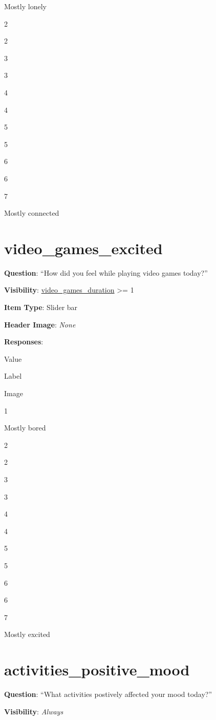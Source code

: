 \documentclass[]{book}
\begin{document}
Mostly lonely

2

2

3

3

4

4

5

5

6

6

7

Mostly connected

\hypertarget{video_games_excited}{%
\section{video\_games\_excited}\label{video_games_excited}}

\textbf{Question}: ``How did you feel while playing video games today?''

\textbf{Visibility}: \protect\hyperlink{video_games_duration}{video\_games\_duration} \textgreater{}= 1

\textbf{Item Type}: Slider bar

\textbf{Header Image}: \emph{None}

\textbf{Responses}:

Value

Label

Image

1

Mostly bored

2

2

3

3

4

4

5

5

6

6

7

Mostly excited

\hypertarget{activities_positive_mood}{%
\section{activities\_positive\_mood}\label{activities_positive_mood}}

\textbf{Question}: ``What activities postively affected your mood today?''

\textbf{Visibility}: \emph{Always}
\end{document}
